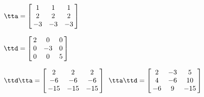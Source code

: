 {$\tta = \left[\hskip -3pt \begin{array}{ccc} 1&1&1\\  2&2&2
\\  -3&-3&-3\end{array}\hskip -3pt \right] $
 
$\ttd = \left[\hskip -3pt \begin{array}{ccc} 2&0&0\\  0&-3&0
\\  0&0&5\end{array}\hskip -3pt \right] $}
{$\ttd\tta= \left[\hskip -3pt \begin{array}{ccc} 2&2&2\\  -6&-6&-6
\\  -15&-15&-15\end{array}\hskip -3pt \right]$\ 
$\tta\ttd =  \left[\hskip -3pt \begin{array}{ccc} 2&-3&5\\  4&-6&10
\\  -6&9&-15\end{array}\hskip -3pt \right] $
}
 

  

  

 

